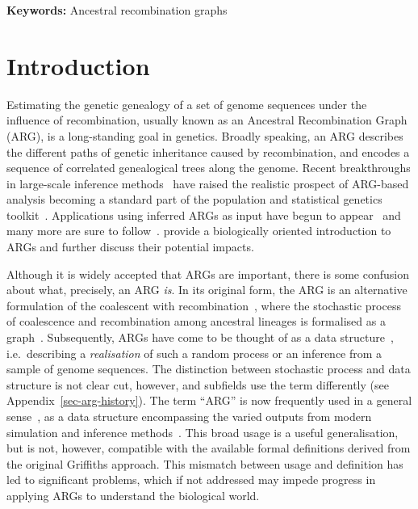 \documentclass{article}
\begin{document}
\textbf{Keywords:} Ancestral recombination graphs

\linenumbers
\section{Introduction}
\label{sec-intro}
Estimating the genetic genealogy of a set of genome sequences
under the influence of recombination,
usually known as an Ancestral Recombination Graph (ARG), is a long-standing
goal in genetics.
Broadly speaking, an ARG describes the different paths of genetic inheritance
caused by recombination, and encodes a sequence of correlated genealogical
trees along the genome.
Recent breakthroughs
in large-scale inference
methods~\citep{rasmussen2014genome,kelleher2019inferring,speidel2019method,
schaefer2021ancestral,wohns2022unified,zhang2023biobank,zhan2023towards}
have raised the realistic prospect of ARG-based analysis becoming a standard part
of the population and statistical genetics toolkit~\citep{hejase2020summary}.
Applications using inferred ARGs as input have begun to
appear~\citep{osmond2021estimating,
fan2022genealogical,
hejase2022deep,
guo2022recombination,
zhang2023biobank,
nowbandegani2023extremely,
ignatieva2023distribution,
fan2023likelihood}
and many more are sure to
follow~\citep{harris2019database,harris2023using}.
\citet{lewanski2023era} provide a biologically oriented introduction to ARGs
and further discuss their potential impacts.

Although it is widely accepted that ARGs are important, there is some
confusion about what, precisely, an ARG \emph{is}.
In its original form, the ARG is an alternative
formulation of the coalescent with recombination~\citep{hudson1983properties},
where the stochastic process of coalescence and recombination
among ancestral lineages is formalised as a
graph~\citep{griffiths1991two,ethier1990two,griffiths1996ancestral,griffiths1997ancestral}.
Subsequently, ARGs have come to be thought of as a data
structure~\citep{minichiello2006mapping}, i.e.\ describing
a \emph{realisation} of such a random process or an
inference from a sample of genome sequences.
The distinction between stochastic process
and data structure is not clear cut, however,
and subfields use the term
differently (see Appendix~\ref{sec-arg-history}).
The term ``ARG'' is now frequently used in a general
sense~\citep[e.g.][]{mathieson2020ancestry,hejase2020summary,
schaefer2021ancestral,harris2023using,zhang2023biobank,fan2023likelihood},
as a data structure
encompassing the varied outputs from modern simulation and
inference methods~\citep{rasmussen2014genome, palamara2016argon, haller2018tree,
kelleher2019inferring, speidel2019method, baumdicker2021efficient, zhang2023biobank}.
This broad usage is a useful generalisation,
but is not, however, compatible with the available formal definitions
derived from the original Griffiths approach.
This mismatch between usage and definition has led to significant
problems, which if not addressed
may impede progress in applying ARGs to understand the biological world.
\end{document}
